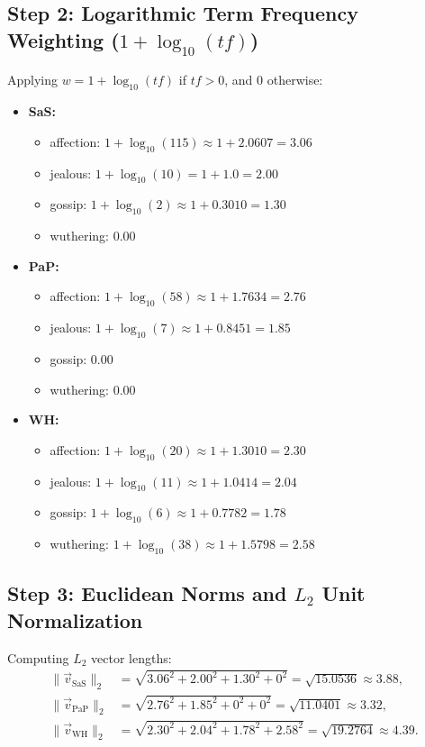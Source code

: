 \subsection[Step 2: Logarithmic Term Frequency Weighting]{Step 2: Logarithmic Term Frequency Weighting ($1 + \log_{10}(tf)$)}
Applying $w = 1 + \log_{10}(tf)$ if $tf > 0$, and $0$ otherwise:
\begin{itemize}
    \item \textbf{SaS:}
    \begin{itemize}
        \item affection: $1 + \log_{10}(115) \approx 1 + 2.0607 = 3.06$
        \item jealous: $1 + \log_{10}(10) = 1 + 1.0 = 2.00$
        \item gossip: $1 + \log_{10}(2) \approx 1 + 0.3010 = 1.30$
        \item wuthering: $0.00$
    \end{itemize}
    \item \textbf{PaP:}
    \begin{itemize}
        \item affection: $1 + \log_{10}(58) \approx 1 + 1.7634 = 2.76$
        \item jealous: $1 + \log_{10}(7) \approx 1 + 0.8451 = 1.85$
        \item gossip: $0.00$
        \item wuthering: $0.00$
    \end{itemize}
    \item \textbf{WH:}
    \begin{itemize}
        \item affection: $1 + \log_{10}(20) \approx 1 + 1.3010 = 2.30$
        \item jealous: $1 + \log_{10}(11) \approx 1 + 1.0414 = 2.04$
        \item gossip: $1 + \log_{10}(6) \approx 1 + 0.7782 = 1.78$
        \item wuthering: $1 + \log_{10}(38) \approx 1 + 1.5798 = 2.58$
    \end{itemize}
\end{itemize}

\subsection[Step 3: Euclidean Norms and L2 Unit Normalization]{Step 3: Euclidean Norms and $L_2$ Unit Normalization}
Computing $L_2$ vector lengths:
\begin{align}
\|\vec{v}_{\text{SaS}}\|_2 &= \sqrt{3.06^2 + 2.00^2 + 1.30^2 + 0^2} = \sqrt{15.0536} \approx \mathbf{3.88}, \\
\|\vec{v}_{\text{PaP}}\|_2 &= \sqrt{2.76^2 + 1.85^2 + 0^2 + 0^2} = \sqrt{11.0401} \approx \mathbf{3.32}, \\
\|\vec{v}_{\text{WH}}\|_2  &= \sqrt{2.30^2 + 2.04^2 + 1.78^2 + 2.58^2} = \sqrt{19.2764} \approx \mathbf{4.39}.
\end{align}

